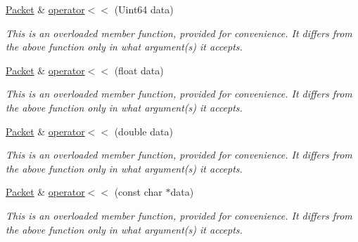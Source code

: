 \begin{DoxyCompactItemize}
\mbox{\hyperlink{classsf_1_1_packet}{Packet}} \& \mbox{\hyperlink{classsf_1_1_packet_a60df5a35a3fb6416131d77232737c68b}{operator$<$$<$}} (Uint64 data)
\begin{DoxyCompactList}\small\item\em This is an overloaded member function, provided for convenience. It differs from the above function only in what argument(s) it accepts. \end{DoxyCompactList}\item 
\mbox{\label{classsf_1_1_packet_a76d31c4f864253a7e9b53701b4660fe5}} 
\mbox{\hyperlink{classsf_1_1_packet}{Packet}} \& \mbox{\hyperlink{classsf_1_1_packet_a76d31c4f864253a7e9b53701b4660fe5}{operator$<$$<$}} (float data)
\begin{DoxyCompactList}\small\item\em This is an overloaded member function, provided for convenience. It differs from the above function only in what argument(s) it accepts. \end{DoxyCompactList}\item 
\mbox{\label{classsf_1_1_packet_a3b3077720a486b569ac8e7dec638a3f0}} 
\mbox{\hyperlink{classsf_1_1_packet}{Packet}} \& \mbox{\hyperlink{classsf_1_1_packet_a3b3077720a486b569ac8e7dec638a3f0}{operator$<$$<$}} (double data)
\begin{DoxyCompactList}\small\item\em This is an overloaded member function, provided for convenience. It differs from the above function only in what argument(s) it accepts. \end{DoxyCompactList}\item 
\mbox{\label{classsf_1_1_packet_a67c9985f7b3d6e90886e56e309280a9d}} 
\mbox{\hyperlink{classsf_1_1_packet}{Packet}} \& \mbox{\hyperlink{classsf_1_1_packet_a67c9985f7b3d6e90886e56e309280a9d}{operator$<$$<$}} (const char $\ast$data)
\begin{DoxyCompactList}\small\item\em This is an overloaded member function, provided for convenience. It differs from the above function only in what argument(s) it accepts. \end{DoxyCompactList}\item 
\mbox{\label{classsf_1_1_packet_a59a21671caaa69da5d47c54b50e1eb54}} 

\end{DoxyCompactItemize}
